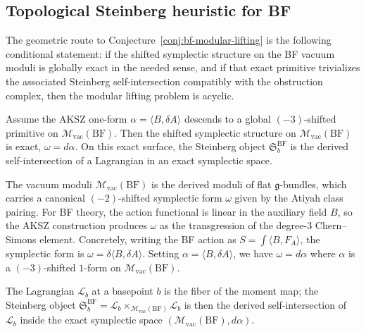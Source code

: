 \subsection{Topological Steinberg heuristic for BF}

\providecommand{\Mvac}{\mathcal{M}_{\mathrm{vac}}}
\providecommand{\Steinberg}{\mathfrak{S}}

The geometric route to Conjecture~\ref{conj:bf-modular-lifting} is the
following conditional statement: if the shifted symplectic structure on the
BF vacuum moduli is globally exact in the needed sense, and if that exact
primitive trivializes the associated Steinberg self-intersection compatibly
with the obstruction complex, then the modular lifting problem is acyclic.

\begin{proposition}
\label{prop:bf-exact-symplectic}
Assume the AKSZ one-form $\alpha=\langle B,\delta A\rangle$ descends to a
global $(-3)$-shifted primitive on $\Mvac(\mathrm{BF})$. Then the shifted
symplectic structure on $\Mvac(\mathrm{BF})$ is exact, $\omega=d\alpha$.
On this exact surface, the Steinberg object
$\Steinberg_b^{\mathrm{BF}}$ is the derived self-intersection of a
Lagrangian in an exact symplectic space.
\end{proposition}

\begin{remark}
The vacuum moduli $\Mvac(\mathrm{BF})$ is the derived moduli of flat
$\mathfrak{g}$-bundles, which carries a canonical $(-2)$-shifted
symplectic form $\omega$ given by the Atiyah class pairing. For BF
theory, the action functional is linear in the auxiliary field $B$, so
the AKSZ construction produces $\omega$ as the transgression of the
degree-$3$ Chern--Simons element. Concretely, writing the BF action
as $S = \int \langle B, F_A \rangle$, the symplectic form is
$\omega = \delta \langle B, \delta A \rangle$. Setting
$\alpha = \langle B, \delta A \rangle$, we have $\omega = d\alpha$
where $\alpha$ is a $(-3)$-shifted $1$-form on $\Mvac(\mathrm{BF})$.

The Lagrangian $\mathcal{L}_b$ at a basepoint $b$ is the fiber of the
moment map; the Steinberg object $\Steinberg_b^{\mathrm{BF}} =
\mathcal{L}_b \times_{\Mvac(\mathrm{BF})} \mathcal{L}_b$ is then
the derived self-intersection of $\mathcal{L}_b$ inside the exact
symplectic space $(\Mvac(\mathrm{BF}), d\alpha)$.
\end{remark}


